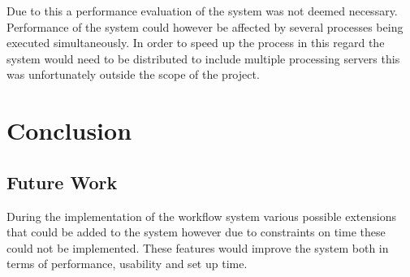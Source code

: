 \documentclass[12pt,a4paper]{report}
\begin{document}
Due to this a performance evaluation of the system was not deemed necessary.
Performance of the system could however be affected by several processes being
executed simultaneously. In order to speed up the process in this regard the
system would need to be distributed to include multiple processing servers this
was unfortunately outside the scope of the project.


\chapter{Conclusion}
\section{Future Work}
During the implementation of the workflow system various possible extensions
that could be added to the system however due to constraints on time these could
not be implemented. These features would improve the system both in terms of
performance, usability and set up time.
\end{document}
